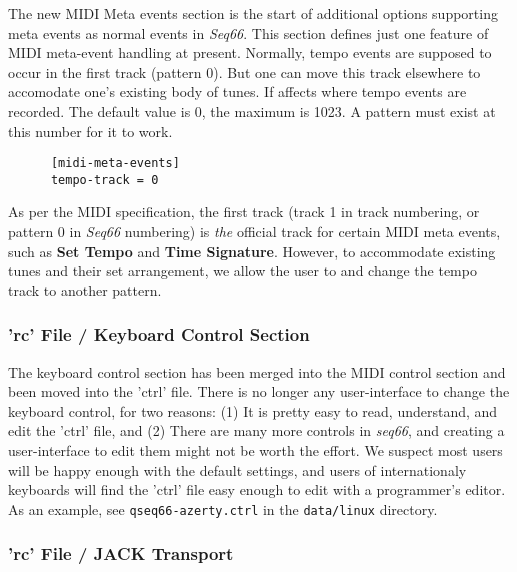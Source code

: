    The new MIDI Meta events section is the start of additional options
   supporting meta events as normal events in \textsl{Seq66}.
   This section defines just one feature of MIDI meta-event handling at present.
   Normally, tempo events are supposed to occur in the first track (pattern 0).
   But one can move this track elsewhere to accomodate one's existing body of
   tunes.  If affects where tempo events are recorded.  The default value is 0,
   the maximum is 1023.  A pattern must exist at this number for it to work.

   \begin{verbatim}
      [midi-meta-events]
      tempo-track = 0
   \end{verbatim}

   As per the MIDI specification, the first track (track 1 in track
   numbering, or pattern 0 in \textsl{Seq66} numbering) is \textsl{the}
   official track for certain MIDI meta events, such as
   \textbf{Set Tempo} and
   \textbf{Time Signature}.
   However, to accommodate existing tunes and their set
   arrangement, we allow the user to
   and change the tempo track to another pattern.

\subsubsection{'rc' File / Keyboard Control Section}
\label{subsubsec:configuration_rc_keyboard_control}

   The keyboard control section has been merged into the MIDI control section
   and been moved into the 'ctrl' file.
   There is no longer any user-interface to change the
   keyboard control, for two reasons:
   (1) It is pretty easy to read, understand, and edit the 'ctrl' file, and
   (2) There are many more controls in \textsl{seq66}, and creating a
   user-interface to edit them might not be worth the effort.
   We suspect most users will be happy enough with the default settings,
   and users of internationaly keyboards will find the 'ctrl' file easy enough
   to edit with a programmer's editor.  As an example,
   see \texttt{qseq66-azerty.ctrl} in the \texttt{data/linux}
   directory.
        
\subsubsection{'rc' File / JACK Transport}
\label{subsubsec:configuration_rc_jack_transport}

